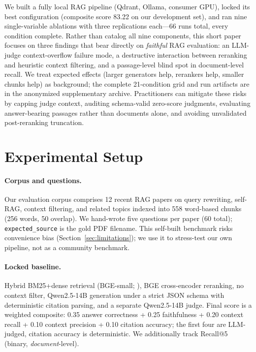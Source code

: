\documentclass[11pt]{article}
\begin{document}
We built a fully local RAG pipeline (Qdrant, Ollama, consumer GPU), locked its best configuration (composite score 83.22 on our development set), and ran nine single-variable ablations with three replications each---66 runs total, every condition complete.
Rather than catalog all nine components, this short paper focuses on three findings that bear directly on \emph{faithful} RAG evaluation: an LLM-judge context-overflow failure mode, a destructive interaction between reranking and heuristic context filtering, and a passage-level blind spot in document-level recall.
We treat expected effects (larger generators help, rerankers help, smaller chunks help) as background; the complete 21-condition grid and run artifacts are in the anonymized supplementary archive.
Practitioners can mitigate these risks by capping judge context, auditing schema-valid zero-score judgments, evaluating answer-bearing passages rather than documents alone, and avoiding unvalidated post-reranking truncation.

\section{Experimental Setup}

\paragraph{Corpus and questions.}
Our evaluation corpus comprises 12 recent RAG papers on query rewriting, self-RAG, context filtering, and related topics indexed into 558 word-based chunks (256 words, 50 overlap).
We hand-wrote five questions per paper (60 total); \texttt{expected\_source} is the gold PDF filename.
This self-built benchmark risks convenience bias (Section~\ref{sec:limitations}); we use it to stress-test our own pipeline, not as a community benchmark.

\paragraph{Locked baseline.}
Hybrid BM25+dense retrieval (BGE-small; \citealt{xiao2024bge}), BGE cross-encoder reranking, no context filter, Qwen2.5-14B generation under a strict JSON schema with deterministic citation parsing, and a separate Qwen2.5-14B judge.
Final score is a weighted composite: 0.35 answer correctness + 0.25 faithfulness + 0.20 context recall + 0.10 context precision + 0.10 citation accuracy; the first four are LLM-judged, citation accuracy is deterministic.
We additionally track Recall@5 (binary, \emph{document}-level).
\end{document}
